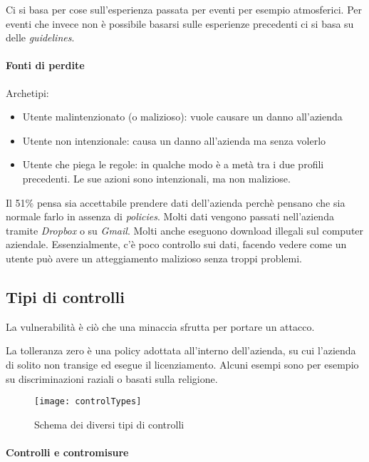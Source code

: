 
Ci si basa per cose sull'esperienza passata per eventi per esempio atmosferici.
Per eventi che invece non è possibile basarsi sulle esperienze precedenti ci si
basa su delle \textit{guidelines}.

\paragraph*{Fonti di perdite}

Archetipi:
\begin{itemize}
\item Utente malintenzionato (o malizioso): vuole causare un danno all'azienda
\item Utente non intenzionale: causa un danno all'azienda ma senza volerlo
\item Utente che piega le regole: in qualche modo è a metà tra i due profili
precedenti. Le sue azioni sono intenzionali, ma non maliziose.
\end{itemize}

Il 51\% pensa sia accettabile prendere dati dell'azienda perchè pensano che sia
normale farlo in assenza di \textit{policies}. Molti dati vengono passati
nell'azienda tramite \textit{Dropbox} o su \textit{Gmail}. Molti anche eseguono
download illegali sul computer aziendale. Essenzialmente, c'è poco controllo sui
dati, facendo vedere come un utente può avere un atteggiamento malizioso senza
troppi problemi.


\subsection{Tipi di controlli}

La vulnerabilità è ciò che una minaccia sfrutta per portare un attacco.


La tolleranza zero è una policy adottata all'interno dell'azienda, su cui
l'azienda di solito non transige ed esegue il licenziamento. Alcuni esempi sono
per esempio su discriminazioni raziali o basati sulla religione.

\begin{figure}[H]
 \centering
 \texttt{[image: controlTypes]}
 \caption{Schema dei diversi tipi di controlli}
\end{figure}



\paragraph*{Controlli e contromisure}

